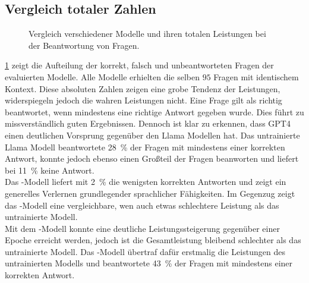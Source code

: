 \subsection{Vergleich totaler Zahlen}
\begin{figure}
    \caption{Vergleich verschiedener Modelle und ihren totalen Leistungen bei der Beantwortung von Fragen.}
    \label{fig:results:answers_total}
\end{figure}
\cref{fig:results:answers_total} zeigt die Aufteilung der korrekt, falsch und unbeantworteten Fragen der evaluierten Modelle.
Alle Modelle erhielten die selben $95$ Fragen mit identischem Kontext.
Diese absoluten Zahlen zeigen eine grobe Tendenz der Leistungen, widerspiegeln jedoch die wahren Leistungen nicht.
Eine Frage gilt als richtig beantwortet, wenn mindestens eine richtige Antwort gegeben wurde.
Dies führt zu missverständlich guten Ergebnissen.
Dennoch ist klar zu erkennen, dass GPT4 einen deutlichen Vorsprung gegenüber den Llama Modellen hat.
Das untrainierte Llama Modell beantwortete \SI{28}{\percent} der Fragen mit mindestens einer korrekten Antwort, konnte jedoch ebenso einen Großteil der Fragen beanworten und liefert bei \SI{11}{\percent} keine Antwort.\\

Das \liv-Modell liefert mit \SI{2}{\percent} die wenigsten korrekten Antworten und zeigt ein generelles Verlernen grundlegender sprachlicher Fähigkeiten.
Im Gegenzug zeigt das \lia-Modell eine vergleichbare, wen auch etwas schlechtere Leistung als das untrainierte Modell.\\

Mit dem \lev-Modell konnte eine deutliche Leistungssteigerung gegenüber einer Epoche erreicht werden, jedoch ist die Gesamtleistung bleibend schlechter als das untrainierte Modell.
Das \lea-Modell übertraf dafür erstmalig die Leistungen des untrainierten Modells und beantwortete \SI{43}{\percent} der Fragen mit mindestens einer korrekten Antwort.\\

